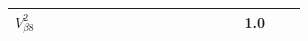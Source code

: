 \documentclass[
	a4paper,
	oneside,
	BCOR = 10mm,
	DIV = 12,
	12pt,
	headings = normal,
]{scrartcl}
\begin{document}
{\begin{landscape}
\begin{table}
\begin{tabular}{%
						l
						*{17}{r}
					}
							$V^{2}_{\beta{}8}$ &  &  &  &  &  &  &  &  &  &  &  &  &  &  & \num{1.0} &  & \\
						\bottomrule
					\end{tabular}
				\end{table}
			\end{landscape}
			}
\end{document}
